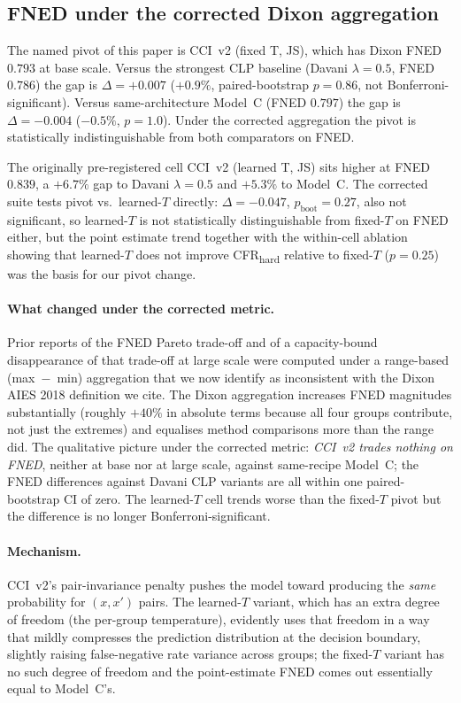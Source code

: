 \subsection{FNED under the corrected Dixon aggregation}
\label{sec:disc_fned}

The named pivot of this paper is CCI~v2 (fixed T, JS), which has Dixon FNED $0.793$ at base scale. Versus the strongest CLP baseline (Davani $\lambda{=}0.5$, FNED $0.786$) the gap is $\Delta = +0.007$ ($+0.9\%$, paired-bootstrap $p = 0.86$, not Bonferroni-significant). Versus same-architecture Model~C (FNED $0.797$) the gap is $\Delta = -0.004$ ($-0.5\%$, $p = 1.0$). Under the corrected aggregation the pivot is statistically indistinguishable from both comparators on FNED.

The originally pre-registered cell CCI~v2 (learned T, JS) sits higher at FNED $0.839$, a $+6.7\%$ gap to Davani $\lambda=0.5$ and $+5.3\%$ to Model~C. The corrected suite tests pivot vs.\ learned-$T$ directly: $\Delta = -0.047$, $p_{\text{boot}} = 0.27$, also not significant, so learned-$T$ is not statistically distinguishable from fixed-$T$ on FNED either, but the point estimate trend together with the within-cell ablation showing that learned-$T$ does not improve CFR\textsubscript{hard} relative to fixed-$T$ ($p = 0.25$) was the basis for our pivot change.

\paragraph{What changed under the corrected metric.}
Prior reports of the FNED Pareto trade-off and of a capacity-bound disappearance of that trade-off at large scale were computed under a range-based (max~$-$~min) aggregation that we now identify as inconsistent with the Dixon AIES 2018 definition we cite. The Dixon aggregation increases FNED magnitudes substantially (roughly $+40\%$ in absolute terms because all four groups contribute, not just the extremes) and equalises method comparisons more than the range did. The qualitative picture under the corrected metric: \emph{CCI~v2 trades nothing on FNED}, neither at base nor at large scale, against same-recipe Model~C; the FNED differences against Davani CLP variants are all within one paired-bootstrap CI of zero. The learned-$T$ cell trends worse than the fixed-$T$ pivot but the difference is no longer Bonferroni-significant.

\paragraph{Mechanism.}
CCI~v2's pair-invariance penalty pushes the model toward producing the \emph{same} probability for $(x, x')$ pairs. The learned-$T$ variant, which has an extra degree of freedom (the per-group temperature), evidently uses that freedom in a way that mildly compresses the prediction distribution at the decision boundary, slightly raising false-negative rate variance across groups; the fixed-$T$ variant has no such degree of freedom and the point-estimate FNED comes out essentially equal to Model~C's.


